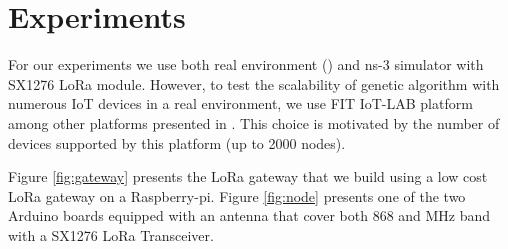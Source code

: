 \section{Experiments} \label{sec:Experiments}

For our experiments we use both real environment () and ns-3 simulator with SX1276 LoRa module.
However,
	to test the scalability of genetic algorithm with numerous IoT devices in a real environment,
	we use FIT IoT-LAB platform among other platforms presented in \cite{tonneau_how_2015}.
This choice is motivated by the number of devices supported by this platform (up to 2000 nodes).

Figure \ref{fig:gateway} presents the LoRa gateway that we build using a low cost LoRa gateway \cite{lowcostloragateway} on a Raspberry-pi.
Figure \ref{fig:node} presents one of the two Arduino boards equipped with an antenna that cover both 868 and  MHz band with a SX1276 LoRa Transceiver.


